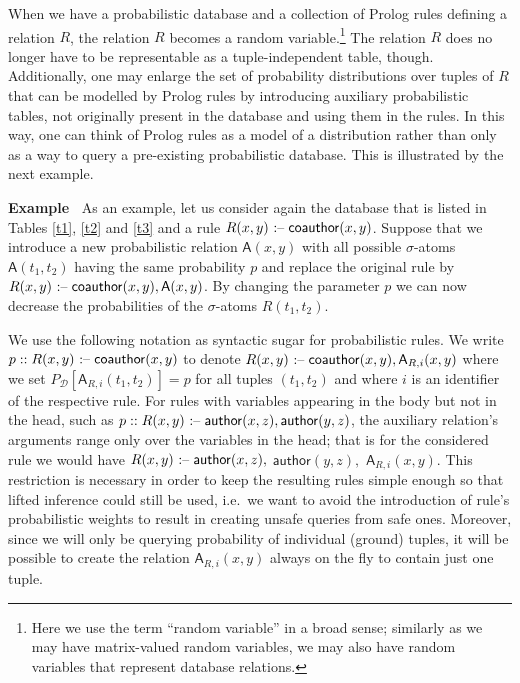\documentclass[akbc,twoside,11pt]{article}
\newcounter{example}
\newenvironment{example}[1][]{\refstepcounter{example}\par\medskip\noindent
   \textbf{Example~\theexample #1} \rmfamily}{\medskip}
\newcommand{\ondrej}[1]{\textcolor{red}{O: {#1}}}
\begin{document}
When we have a probabilistic database and a collection of Prolog rules defining a relation $R$, the relation $R$ becomes a random variable.\footnote{Here we use the term ``random variable'' in a broad sense; similarly as we may have matrix-valued random variables, we may also have random variables that represent database relations.} The relation $R$ does no longer have to be representable as a tuple-independent table, though. Additionally, one may enlarge the set of probability distributions over tuples of $R$ that can be modelled by Prolog rules by introducing auxiliary probabilistic tables, not originally present in the database and using them in the rules. In this way, one can think of Prolog rules as a model of a distribution rather than only as a way to query a pre-existing probabilistic database. This is illustrated by the next example.

\begin{example}
As an example, let us consider again the database that is listed in Tables \ref{t1}, \ref{t2} and \ref{t3} and a rule $R(x,y) \mbox{ \textnormal{:--}}\; \mathsf{coauthor}(x,y)$. Suppose that we introduce a new probabilistic relation $\mathsf{A}(x,y)$ with all possible $\sigma$-atoms $\mathsf{A}(t_1,t_2)$ having the same probability $p$ and replace the original rule by $R(x,y) \mbox{ \textnormal{:--}}\; \mathsf{coauthor}(x,y), \mathsf{A}(x,y)$. By changing the parameter $p$ we can now decrease the probabilities of the $\sigma$-atoms $R(t_1,t_2)$. 
\end{example}

We use the following notation as syntactic sugar for probabilistic rules. We write $p :: R(x,y) \mbox{ \textnormal{:--}}\; \mathsf{coauthor}(x,y)$ to denote $R(x,y) \mbox{ \textnormal{:--}}\; \mathsf{coauthor}(x,y), \mathsf{A}_{R,i}(x,y)$ where we set $P_{\mathcal{D}}[\mathsf{A}_{R,i}(t_1,t_2)] = p$ for all tuples $(t_1, t_2)$ and where $i$ is an identifier of the respective rule. 
For rules with variables appearing in the body but not in the head, such as $p :: R(x,y) \mbox{ \textnormal{:--}}\; \mathsf{author}(x,z), \mathsf{author}(y,z)$, the auxiliary relation's arguments range only over the variables in the head; that is for the considered rule we would have $R(x,y) \mbox{ \textnormal{:--}}\; \mathsf{author}(x,z),$ $\mathsf{author}(y,z),$ $\mathsf{A}_{R,i}(x,y).$ 
This restriction is necessary in order to keep the resulting rules simple enough so that lifted inference could still be used, i.e.\ we want to avoid the introduction of rule's probabilistic weights to result in creating unsafe queries from safe ones. Moreover, since we will only be querying probability of individual (ground) tuples, it will be possible to create the relation $\mathsf{A}_{R,i}(x,y)$ always on the fly to contain just one tuple.
\end{document}
